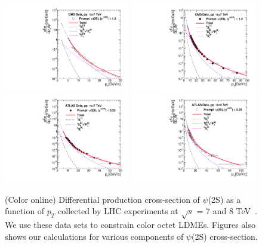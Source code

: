 \documentclass[aps,prc,preprint,superscriptaddress,showpacs,showkeys,amsmath]{revtex4-1}
\begin{document}
\begin{figure}
\includegraphics[width=0.49\textwidth]{Figures/Psi2S/Psi2S_CMS_LowPt.pdf}
\includegraphics[width=0.49\textwidth]{Figures/Psi2S/Psi2S_CMS_HighPt.pdf}
\includegraphics[width=0.49\textwidth]{Figures/Psi2S/Psi2S_ATLAS.pdf}
\includegraphics[width=0.49\textwidth]{Figures/Psi2S/Psi2S_ATLAS_8TeV.pdf}
\caption{(Color online) Differential production cross-section of $\psi$(2S) 
as a function of $p_{T}$ collected by LHC experiments at $\sqrt{s}$ = 7 and 8 
TeV~\cite{Chatrchyan:2011kc,Khachatryan:2015rra,Aad:2015duc}. We use these data 
sets to constrain color octet LDMEs. Figures also shows our calculations for 
various components of $\psi$(2S) cross-section.}
\label{Fig:LDMEPsi2S}
\end{figure}
\end{document}
